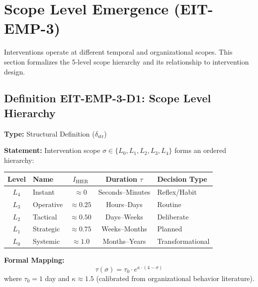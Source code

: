 \section{Scope Level Emergence (EIT-EMP-3)}
\label{sec:ie-scope-levels}

Interventions operate at different temporal and organizational scopes. This section formalizes the 5-level scope hierarchy and its relationship to intervention design.

\subsection{Definition EIT-EMP-3-D1: Scope Level Hierarchy}
\label{subsec:scope-hierarchy}

\begin{tcolorbox}[colback=blue!5!white, colframe=blue!75!black,
    title=\textbf{Definition EIT-EMP-3-D1: Five-Level Scope Hierarchy}]

\textbf{Type:} Structural Definition ($\delta_{\text{str}}$)

\textbf{Statement:} Intervention scope $\sigma \in \{L_0, L_1, L_2, L_3, L_4\}$ forms an ordered hierarchy:

\begin{center}
\begin{tabular}{clccl}
\toprule
\textbf{Level} & \textbf{Name} & \textbf{$I_{\text{HIER}}$} & \textbf{Duration $\tau$} & \textbf{Decision Type} \\
\midrule
$L_4$ & Instant & $\approx 0$ & Seconds--Minutes & Reflex/Habit \\
$L_3$ & Operative & $\approx 0.25$ & Hours--Days & Routine \\
$L_2$ & Tactical & $\approx 0.50$ & Days--Weeks & Deliberate \\
$L_1$ & Strategic & $\approx 0.75$ & Weeks--Months & Planned \\
$L_0$ & Systemic & $\approx 1.0$ & Months--Years & Transformational \\
\bottomrule
\end{tabular}
\end{center}

\textbf{Formal Mapping:}
\begin{equation}
\tau(\sigma) = \tau_0 \cdot e^{\kappa \cdot (4 - \sigma)}
\end{equation}
where $\tau_0 = 1$ day and $\kappa \approx 1.5$ (calibrated from organizational behavior literature).

\end{tcolorbox}

